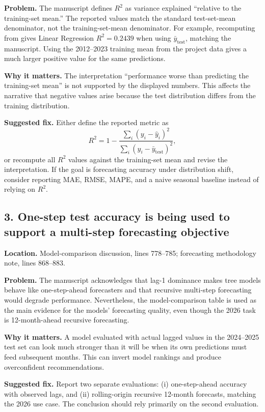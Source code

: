 \documentclass[11pt]{article}
\begin{document}
\textbf{Problem.} The manuscript defines \(R^2\) as variance explained ``relative to the training-set mean.'' The reported values match the standard test-set-mean denominator, not the training-set-mean denominator. For example, recomputing from  gives Linear Regression \(R^2=0.2439\) when using \(\bar y_{\mathrm{test}}\), matching the manuscript. Using the 2012--2023 training mean from the project data gives a much larger positive value for the same predictions.

\textbf{Why it matters.} The interpretation ``performance worse than predicting the training-set mean'' is not supported by the displayed numbers. This affects the narrative that negative values arise because the test distribution differs from the training distribution.

\textbf{Suggested fix.} Either define the reported metric as
\[
R^2 = 1 - \frac{\sum_i (y_i - \hat y_i)^2}{\sum_i (y_i - \bar y_{\mathrm{test}})^2},
\]
or recompute all \(R^2\) values against the training-set mean and revise the interpretation. If the goal is forecasting accuracy under distribution shift, consider reporting MAE, RMSE, MAPE, and a naive seasonal baseline instead of relying on \(R^2\).

\subsection*{3. One-step test accuracy is being used to support a multi-step forecasting objective}

\textbf{Location.} Model-comparison discussion, lines 778--785; forecasting methodology note, lines 868--883.

\textbf{Problem.} The manuscript acknowledges that lag-1 dominance makes tree models behave like one-step-ahead forecasters and that recursive multi-step forecasting would degrade performance. Nevertheless, the model-comparison table is used as the main evidence for the models' forecasting quality, even though the 2026 task is 12-month-ahead recursive forecasting.

\textbf{Why it matters.} A model evaluated with actual lagged values in the 2024--2025 test set can look much stronger than it will be when its own predictions must feed subsequent months. This can invert model rankings and produce overconfident recommendations.

\textbf{Suggested fix.} Report two separate evaluations: (i) one-step-ahead accuracy with observed lags, and (ii) rolling-origin recursive 12-month forecasts, matching the 2026 use case. The conclusion should rely primarily on the second evaluation.
\end{document}
